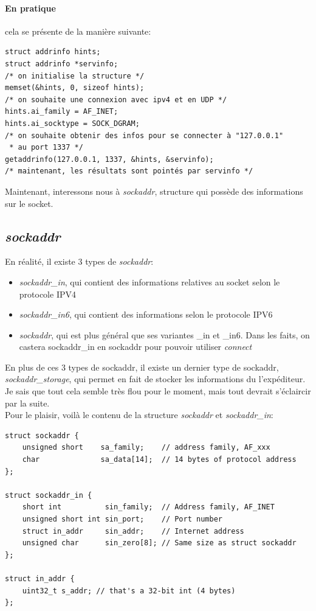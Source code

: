 \documentclass{report}
\begin{document}
\paragraph{En pratique} cela se présente de la manière suivante:
\begin{lstlisting}
struct addrinfo hints;
struct addrinfo *servinfo;
/* on initialise la structure */
memset(&hints, 0, sizeof hints);
/* on souhaite une connexion avec ipv4 et en UDP */
hints.ai_family = AF_INET;
hints.ai_socktype = SOCK_DGRAM;
/* on souhaite obtenir des infos pour se connecter à "127.0.0.1"
 * au port 1337 */
getaddrinfo(127.0.0.1, 1337, &hints, &servinfo);
/* maintenant, les résultats sont pointés par servinfo */
\end{lstlisting}
Maintenant, interessons nous à \emph{sockaddr}, structure qui possède des informations sur le socket.

\subsection{\emph{sockaddr}}
En réalité, il existe 3 types de \emph{sockaddr}:
\begin{itemize}
\item{\emph{sockaddr\_in}, qui contient des informations relatives au socket selon le protocole IPV4}
\item{\emph{sockaddr\_in6}, qui contient des informations selon le protocole IPV6}
\item{\emph{sockaddr}, qui est plus général que ses variantes \_in et \_in6. Dans les faits, on castera sockaddr\_in en sockaddr pour pouvoir utiliser \emph{connect}}
\end{itemize}
En plus de ces 3 types de sockaddr, il existe un dernier type de sockaddr, \emph{sockaddr\_storage}, qui permet en fait de stocker les informations du l'expéditeur. Je sais que tout cela semble très flou pour le moment, mais tout devrait s'éclaircir par la suite.\\
Pour le plaisir, voilà le contenu de la structure \emph{sockaddr} et \emph{sockaddr\_in}:
\begin{lstlisting}
struct sockaddr {
    unsigned short    sa_family;    // address family, AF_xxx
    char              sa_data[14];  // 14 bytes of protocol address
};

struct sockaddr_in {
    short int          sin_family;  // Address family, AF_INET
    unsigned short int sin_port;    // Port number
    struct in_addr     sin_addr;    // Internet address
    unsigned char      sin_zero[8]; // Same size as struct sockaddr
};

struct in_addr {
    uint32_t s_addr; // that's a 32-bit int (4 bytes)
};
\end{lstlisting}
\end{document}

